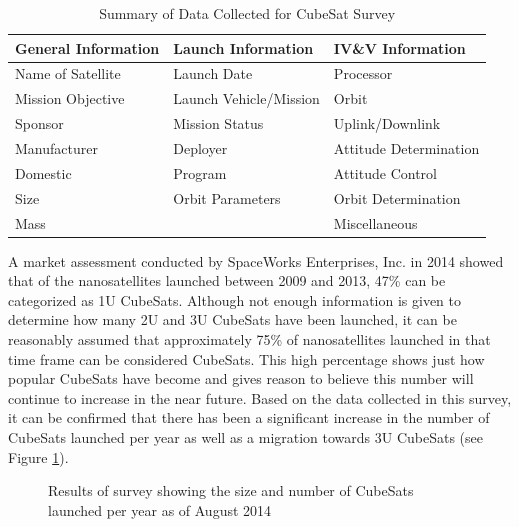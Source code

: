 \documentclass[11pt]{article}
\begin{document}
\begin{table}[h]
\centering
\caption{Summary of Data Collected for CubeSat Survey}
\label{summary}
\begin{tabular}{|l|l|l|}
\hline
\textbf{General Information} & \textbf{Launch Information} & \textbf{IV\&V Information} \\ \hline
Name of Satellite & Launch Date & Processor \\ \hline
Mission Objective & Launch Vehicle/Mission & Orbit \\ \hline
Sponsor & Mission Status & Uplink/Downlink \\ \hline
Manufacturer & Deployer & Attitude Determination \\ \hline
Domestic & Program & Attitude Control \\ \hline
Size & Orbit Parameters & Orbit Determination \\ \hline
Mass &  & Miscellaneous \\ \hline
\end{tabular}
\end{table}
A market assessment conducted by SpaceWorks Enterprises, Inc. in 2014 showed that of the nanosatellites launched between 2009 and 2013, 47\% can be categorized as 1U CubeSats.  Although not enough information is given to determine how many 2U and 3U CubeSats have been launched, it can be reasonably assumed that approximately 75\% of nanosatellites launched in that time frame can be considered CubeSats.  This high percentage shows just how popular CubeSats have become and gives reason to believe this number will continue to increase in the near future.  Based on the data collected in this survey, it can be confirmed that there has been a significant increase in the number of CubeSats launched per year as well as a migration towards 3U CubeSats (see Figure \ref{peryear}). 

\begin{figure}[ht!]
\centering
{}
\caption{Results of survey showing the size and number of CubeSats launched per year as of August 2014}
\label{peryear}
\end{figure}
\end{document}
